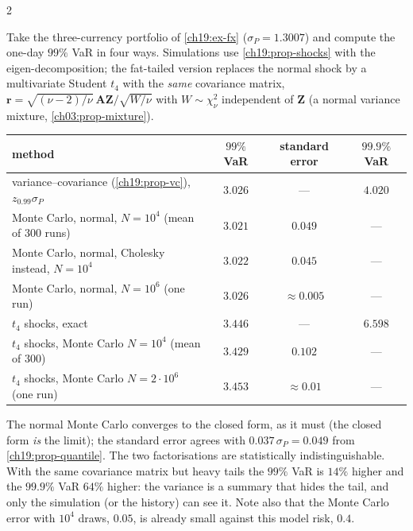\begin{paracol}{2}
\begin{casestudy}\label{ch19:cs-three}
Take the three-currency portfolio of \cref{ch19:ex-fx} ($\sigma_P=1.3007$) and compute the one-day $99\%$ VaR in four ways. Simulations use \cref{ch19:prop-shocks} with the eigen-decomposition; the fat-tailed version replaces the normal shock by a multivariate Student $t_4$ with the \emph{same} covariance matrix, $\bm r=\sqrt{(\nu-2)/\nu}\ \bm A\bm Z/\sqrt{W/\nu}$ with $W\sim\chi^2_\nu$ independent of $\bm Z$ (a normal variance mixture, \cref{ch03:prop-mixture}).
\begin{center}\small
\begin{tabular}{@{}lccc@{}}
\toprule
method & $99\%$ VaR & standard error & $99.9\%$ VaR\\
\midrule
variance--covariance (\cref{ch19:prop-vc}), $z_{0.99}\sigma_P$ & $3.026$ & --- & $4.020$\\
Monte Carlo, normal, $N=10^4$ (mean of $300$ runs) & $3.021$ & $0.049$ & --- \\
Monte Carlo, normal, Cholesky instead, $N=10^4$ & $3.022$ & $0.045$ & --- \\
Monte Carlo, normal, $N=10^6$ (one run) & $3.026$ & $\approx0.005$ & --- \\
$t_4$ shocks, exact & $3.446$ & --- & $6.598$\\
$t_4$ shocks, Monte Carlo $N=10^4$ (mean of $300$) & $3.429$ & $0.102$ & --- \\
$t_4$ shocks, Monte Carlo $N=2\cdot10^6$ (one run) & $3.453$ & $\approx0.01$ & --- \\
\bottomrule
\end{tabular}
\end{center}
The normal Monte Carlo converges to the closed form, as it must (the closed form \emph{is} the limit); the standard error agrees with $0.037\,\sigma_P=0.049$ from \cref{ch19:prop-quantile}. The two factorisations are statistically indistinguishable. With the same covariance matrix but heavy tails the $99\%$ VaR is $14\%$ higher and the $99.9\%$ VaR $64\%$ higher: the variance is a summary that hides the tail, and only the simulation (or the history) can see it. Note also that the Monte Carlo error with $10^4$ draws, $0.05$, is already small against this model risk, $0.4$.
\end{casestudy}


\end{paracol}
